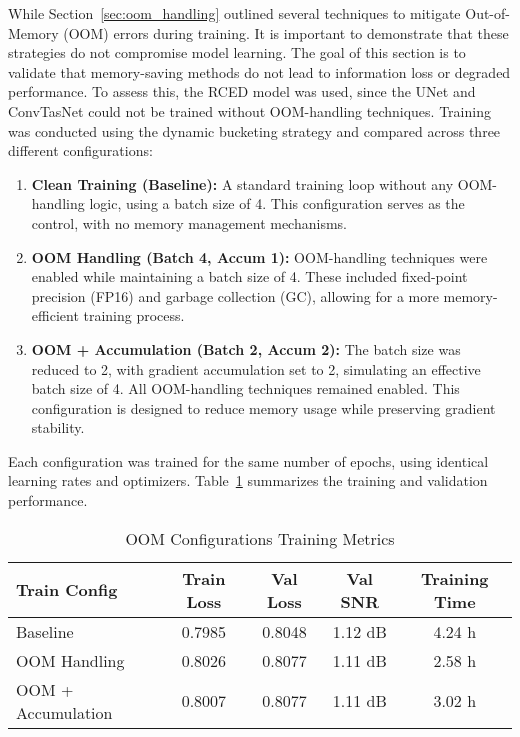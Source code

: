 While Section~\ref{sec:oom_handling} outlined several techniques to mitigate Out-of-Memory (OOM) errors during training. It is important to demonstrate that these strategies do not compromise model learning. The goal of this section is to validate that memory-saving methods do not lead to information loss or degraded performance. To assess this, the RCED model was used, since the UNet and ConvTasNet could not be trained without OOM-handling techniques. Training was conducted using the dynamic bucketing strategy and compared across three different configurations:

\begin{enumerate}
    \item \textbf{Clean Training (Baseline):} A standard training loop without any OOM-handling logic, using a batch size of 4. This configuration serves as the control, with no memory management mechanisms.
    
    \item \textbf{OOM Handling (Batch 4, Accum 1):} OOM-handling techniques were enabled while maintaining a batch size of 4. These included fixed-point precision (FP16) and garbage collection (GC), allowing for a more memory-efficient training process.
    
    \item \textbf{OOM + Accumulation (Batch 2, Accum 2):} The batch size was reduced to 2, with gradient accumulation set to 2, simulating an effective batch size of 4. All OOM-handling techniques remained enabled. This configuration is designed to reduce memory usage while preserving gradient stability.
\end{enumerate}

Each configuration was trained for the same number of epochs, using identical learning rates and optimizers. Table~\ref{tab:oom_training} summarizes the training and validation performance.

\vspace{1em}
\begin{table}[H]
\centering
\caption{OOM Configurations Training Metrics}
\label{tab:oom_training}
\begin{tabular}{|l|c|c|c|c|}
\hline
\textbf{Train Config} & \textbf{Train Loss} & \textbf{Val Loss} & \textbf{Val SNR} & \textbf{Training Time} \\
\hline
Baseline               & 0.7985 & 0.8048 & 1.12 dB & 4.24 h \\
OOM Handling           & 0.8026 & 0.8077 & 1.11 dB & 2.58 h \\
OOM + Accumulation     & 0.8007 & 0.8077 & 1.11 dB & 3.02 h \\
\hline
\end{tabular}
\end{table}

